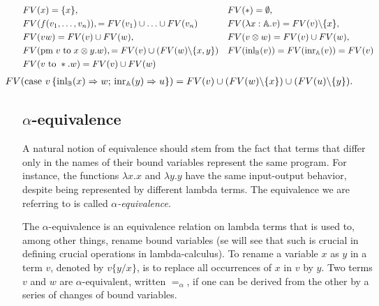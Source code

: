 \begin{equation*}
\begin{split}
&FV(x) = \{x\}, &&  FV(*) = \emptyset,  \\
&FV(f(v_1, \ldots, v_n)), = FV(v_1) \cup \ldots \cup FV(v_n)&& FV(\lambda x: \mathbb{A}. v) = FV(v) \backslash \{x\}, \\
&FV(v w) = FV(v) \cup FV(w), && FV(v \otimes w) = FV(v) \cup FV(w), \\
& FV(\text{pm} \hspace{3 pt} v \hspace{3 pt} \text{to} \hspace{3 pt} x \otimes y. w), = FV(v) \cup (FV(w)  \backslash \{x,y\}) &&  FV(\text{inl}_{\mathbb{B}} (v)) =  FV(\text{inr}_{\mathbb{A}} (v)) = FV(v)\\
&FV(v \text{ to } *.w) = FV(v) \cup FV(w)  &&   \\
\end{split}
\end{equation*}
\vspace{-20pt}
\vspace{1pt}
\begin{equation*}
  \begin{split}
& \hspace{-30pt} FV(\text{case } v \,   \{\text{inl}_{\typeB} (x) \Rightarrow w ; \, \text{inr}_{\typeA} (y) \Rightarrow u\}) = FV(v) \cup  (FV(w) \backslash \{x\}) \cup (FV(u)\backslash \{y\}).
\end{split}
\end{equation*}


\subsection{$\alpha$-equivalence}


 
A natural notion of equivalence should stem from the fact that terms that differ only in the names of their bound variables represent the same program. For instance, the functions $\lambda x.x $ and $\lambda y.y$ have the same input-output behavior, despite being represented by different lambda terms. The equivalence we are referring to is called $\alpha$\emph{-equivalence}.

\begin{definition} 
  The $\alpha$-equivalence is an equivalence relation on lambda terms that is used to, among other things, rename bound variables (se will see that such is crucial in defining crucial operations in lambda-calculus). To rename a variable $x$ as $y$ in a term $v$, denoted by $v\{y/x\}$, is to replace all occurrences of $x$ in $v$ by $y$. Two terms $v$ and $w$ are $\alpha$-equivalent, written $=_{\alpha}$, if one can be derived from the other by a series of changes of bound variables.
\end{definition}

